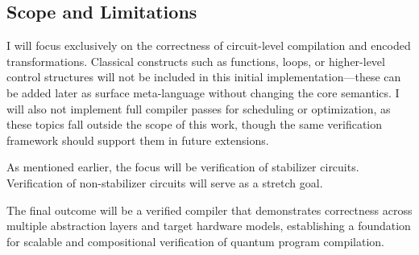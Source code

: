 \subsection{Scope and Limitations}

I will focus exclusively on the correctness of circuit-level compilation and encoded transformations.  
Classical constructs such as functions, loops, or higher-level control structures will not be included in this initial implementation---these can be added later as surface meta-language without changing the core semantics.
I will also not implement full compiler passes for scheduling or optimization, as these topics fall outside the scope of this work, though the same verification framework should support them in future extensions.

As mentioned earlier, the focus will be verification of stabilizer circuits. Verification of non-stabilizer circuits will serve as a stretch goal.

The final outcome will be a verified compiler that demonstrates correctness across multiple abstraction layers and target hardware models, establishing a foundation for scalable and compositional verification of quantum program compilation.
